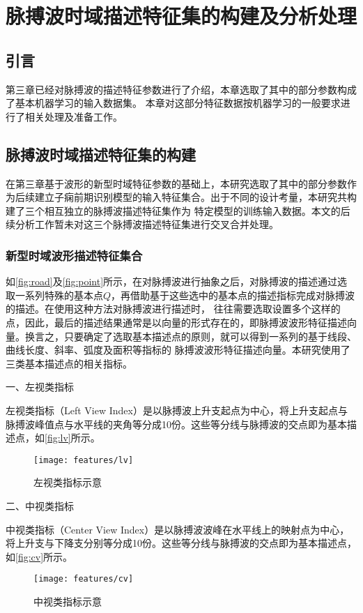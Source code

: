 \chapter{脉搏波时域描述特征集的构建及分析处理}
\section{引言}
第三章已经对脉搏波的描述特征参数进行了介绍，本章选取了其中的部分参数构成了基本机器学习的输入数据集。
本章对这部分特征数据按机器学习的一般要求进行了相关处理及准备工作。

\section{脉搏波时域描述特征集的构建}
在第三章基于波形的新型时域特征参数的基础上，本研究选取了其中的部分参数作为后续建立子痫前期识别模型的输入特征集合。出于不同的设计考量，本研究共构建了三个相互独立的脉搏波描述特征集作为
特定模型的训练输入数据。本文的后续分析工作暂未对这三个脉搏波描述特征集进行交叉合并处理。

\subsection{新型时域波形描述特征集合}

如\autoref{fig:road}及\autoref{fig:point}所示，在对脉搏波进行抽象之后，对脉搏波的描述通过选取一系列特殊的基本点$Q$，再借助基于这些选中的基本点的描述指标完成对脉搏波的描述。在使用这种方法对脉搏波进行描述时，
往往需要选取设置多个这样的点，因此，最后的描述结果通常是以向量的形式存在的，即脉搏波波形特征描述向量。换言之，只要确定了选取基本描述点的原则，就可以得到一系列的基于线段、曲线长度、斜率、弧度及面积等指标的
脉搏波波形特征描述向量。本研究使用了三类基本描述点的相关指标。

一、左视类指标

左视类指标（Left View Index）是以脉搏波上升支起点为中心，将上升支起点与脉搏波峰值点与水平线的夹角等分成10份。这些等分线与脉搏波的交点即为基本描述点，如\autoref{fig:lv}所示。
\begin{figure}[htbp]
  \centering
  \texttt{[image: features/lv]}
  \caption{\label{fig:lv}左视类指标示意}
\end{figure}

二、中视类指标

中视类指标（Center View Index）是以脉搏波波峰在水平线上的映射点为中心，将上升支与下降支分别等分成10份。这些等分线与脉搏波的交点即为基本描述点，如\autoref{fig:cv}所示。
\begin{figure}[htbp]
  \centering
  \texttt{[image: features/cv]}
  \caption{\label{fig:cv}中视类指标示意}
\end{figure}

